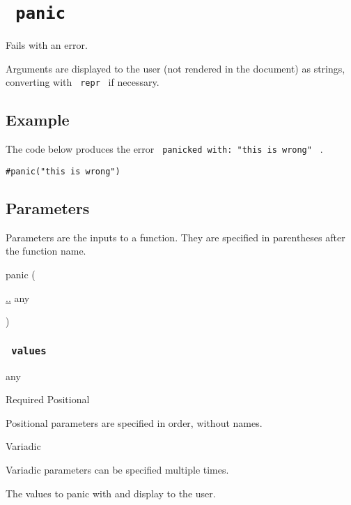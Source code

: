 \section{\texorpdfstring{\texttt{\ panic\ }}{ panic }}\label{summary}

Fails with an error.

Arguments are displayed to the user (not rendered in the document) as
strings, converting with \texttt{\ repr\ } if necessary.

\subsection{Example}\label{example}

The code below produces the error
\texttt{\ panicked\ with:\ "this\ is\ wrong"\ } .

\begin{verbatim}
#panic("this is wrong")
\end{verbatim}

\subsection{\texorpdfstring{{ Parameters
}}{ Parameters }}\label{parameters}

\label{parameters-tooltip}
Parameters are the inputs to a function. They are specified in
parentheses after the function name.

{ panic } (

{ \hyperref[parameters-values]{..} { any } }

)

\subsubsection{\texorpdfstring{\texttt{\ values\ }}{ values }}\label{parameters-values}

{ any }

{Required} {{ Positional }}

\label{parameters-values-positional-tooltip}
Positional parameters are specified in order, without names.

{{ Variadic }}

\label{parameters-values-variadic-tooltip}
Variadic parameters can be specified multiple times.

The values to panic with and display to the user.

\href{/docs/reference/foundations/none/}{\pandocbounded{}}

